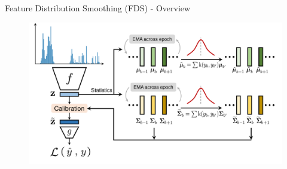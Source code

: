 \begin{frame}{Feature Distribution Smoothing (FDS) - Overview}
	\begin{figure}[h]
		\includegraphics[width=\linewidth]{images/teaser_fds.pdf}
	\end{figure}
\end{frame}
